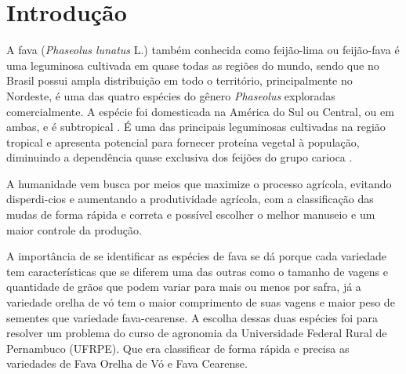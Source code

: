 \section{Introdução} 


A fava (\textit{Phaseolus lunatus} L.) também conhecida como feijão-lima ou feijão-fava é uma leguminosa cultivada em quase todas as regiões do mundo, sendo que no Brasil possui ampla distribuição em todo o território, principalmente no Nordeste, é uma das quatro espécies do gênero \textit{Phaseolus} exploradas comercialmente. A espécie foi domesticada na América do Sul ou Central, ou em ambas, e é subtropical \cite{zimmermann1988origem}. É uma das principais leguminosas cultivadas na região tropical e apresenta potencial para fornecer proteína vegetal à população, diminuindo a dependência quase exclusiva dos feijões do grupo carioca \cite{vieira1992cultura}. 



A humanidade vem busca por meios que maximize o processo agrícola, evitando disperdi-cios e aumentando a produtividade agrícola, com a classificação das mudas de forma rápida e correta e possível escolher o melhor manuseio e um maior controle da produção.

A importância de se identificar as espécies de fava se dá porque cada variedade tem características que se diferem uma das outras como o tamanho de vagens e quantidade de grãos que podem variar para mais ou menos por safra, já a variedade orelha de vó tem o maior comprimento de suas vagens e maior peso de sementes que variedade fava-cearense. A escolha dessas duas espécies foi para resolver um problema do curso de agronomia da Universidade Federal Rural de Pernambuco (UFRPE). Que era classificar de forma rápida e precisa as variedades de Fava Orelha de Vó e Fava Cearense. 

